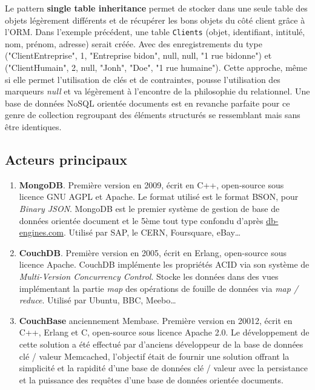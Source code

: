 	Le pattern \textbf{single table inheritance} permet de stocker dans une seule table des objets légèrement différents et de récupérer les bons objets du côté client grâce à l'ORM. Dans l'exemple précédent, une table \texttt{Clients} (objet, identifiant, intitulé, nom, prénom, adresse) serait créée. Avec des enregistrements du type ("ClientEntreprise", 1, "Entreprise bidon", null, null, "1 rue bidonne") et ("ClientHumain", 2, null, "Jonh", "Doe", "1 rue humaine"). Cette approche, même si elle permet l'utilisation de clés et de contraintes, pousse l'utilisation des marqueurs \textit{null} et va légèrement à l'encontre de la philosophie du relationnel. Une base de données NoSQL orientée documents est en revanche parfaite pour ce genre de collection regroupant des éléments structurés se ressemblant mais sans être identiques.

\subsection{Acteurs principaux}

	\begin{enumerate}
		\item \textbf{MongoDB}. Première version en 2009, écrit en C++, open-source sous licence GNU AGPL et Apache. Le format utilisé est le format BSON, pour \textit{Binary JSON}. MongoDB est le premier système de gestion de base de données orientée document et le 5ème tout type confondu d'après \url{db-engines.com}. Utilisé par SAP, le CERN, Foursquare, eBay\dots\cite{Wikipedia_mongodb}
		\item \textbf{CouchDB}. Première version en 2005, écrit en Erlang, open-source sous licence Apache. CouchDB implémente les propriétés ACID via son système de \textit{Multi-Version Concurrency Control}. Stocke les données dans des vues implémentant la partie \textit{map} des opérations de fouille de données via \textit{map / reduce}. Utilisé par Ubuntu, BBC, Meebo\dots\cite{Wikipedia_couchdb}
		\item \textbf{CouchBase} anciennement Membase. Première version en 20012, écrit en C++, Erlang et C, open-source sous licence Apache 2.0. Le développement de cette solution a été effectué par d'anciens développeur de la base de données clé / valeur Memcached, l'objectif était de fournir une solution offrant la simplicité et la rapidité d'une base de données clé / valeur avec la persistance et la puissance des requêtes d'une base de données orientée documents.\cite{Wikipedia_couchbase}
	\end{enumerate}
